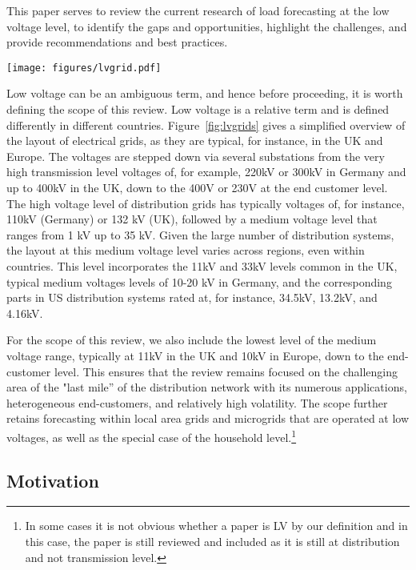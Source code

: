 This paper serves to review the current research of load forecasting at the low voltage level, to identify the gaps and opportunities, highlight the challenges, and provide recommendations and best practices.

\begin{figure*}
	\texttt{[image: figures/lvgrid.pdf]}\par 
	\caption{Overview of typical high, medium and low voltage grid layout. This shaded area shows the scope of this review. }
	\label{fig:lvgrids}
\end{figure*}

Low voltage can be an ambiguous term, and hence before proceeding, it is worth defining the scope of this review. Low voltage is a relative term and is defined differently in different countries. Figure~\ref{fig:lvgrids} gives a simplified overview of the layout of electrical grids, as they are typical, for instance, in the UK and Europe. The voltages are stepped down via several substations from the very high transmission level voltages of, for example, 220kV or 300kV in Germany and up to 400kV in the UK, down to the 400V or 230V at the end customer level. The high voltage level of distribution grids has typically voltages of, for instance, 110kV (Germany) or 132 kV (UK), followed by a medium voltage level that ranges from 1 kV up to 35 kV. Given the large number of distribution systems, the layout at this medium voltage level varies across regions, even within countries. This level incorporates the 11kV and 33kV levels common in the UK, typical medium voltages levels of 10-20 kV in Germany, and the corresponding parts in US distribution systems rated at, for instance, 34.5kV, 13.2kV, and 4.16kV. 

For the scope of this review, we also include the lowest level of the medium voltage range, typically at 11kV in the UK and 10kV in Europe, down to the end-customer level. This ensures that the review remains focused on the challenging area of the "last mile'' of the distribution network with its numerous applications, heterogeneous end-customers, and relatively high volatility. The scope further retains forecasting within local area grids and microgrids that are operated at low voltages, as well as the special case of the household level.\footnote{In some cases it is not obvious whether a paper is LV by our definition and in this case, the paper is still reviewed and included as it is still at distribution and not transmission level.}

\subsection{Motivation}
\label{sec_motivation_relatedrevs}

